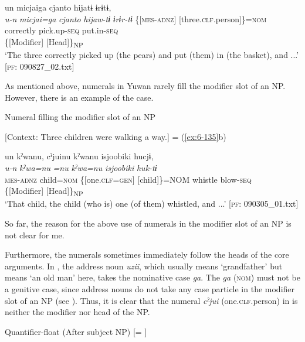 \ex \label{ex:7:14b}
{\TM}
\glll un  micjaiga  {\textbar}cjanto{\textbar}  hijatɨ  ɨrɨtɨ,\\
      \textit{u-n}  \textit{micjai=ga}  \textit{cjanto}  \textit{hijaw-tɨ}      \textit{ɨrɨr-tɨ}
      \{[\textsc{mes}-\textsc{adnz}]  [three.\textsc{clf}.person]\}=\textsc{nom}  correctly  pick.up-\textsc{seq}            put.in-\textsc{seq}\\
      \{[Modifier]  [Head]\}\textsubscript{NP}    \\
\glt    ‘The three correctly picked up (the pears) and put (them) in (the basket), and ...’     [\textsc{pf}: 090827\_02.txt]

    \z
\z

As mentioned above, numerals in Yuwan rarely fill the modifier slot of an NP. However, there is an example of the case.

\ea \label{ex:7:15}  Numeral filling the modifier slot of an NP

  [Context: Three children were walking a way.] = (\ref{ex:6-135}b)

{\TM}
\gllll  un  kˀwanu,  cˀjuinu  kˀwanu  isjoobiki   hucjɨ,\\
\textit{u-n}  \textit{kˀwa=nu}  \textit{=nu}  \textit{kˀwa=nu}  \textit{isjoobiki} \textit{huk-tɨ}\\
\textsc{mes}-\textsc{adnz}  child=\textsc{nom}  \{[one.\textsc{clf}=\textsc{gen}]  [child]\}=NOM  whistle   blow-\textsc{seq}\\
\{[Modifier]  [Head]\}\textsubscript{NP}      \\
\glt ‘That child, the child (who is) one (of them) whistled, and ...’ [\textsc{pf}: 090305\_01.txt]

\z

So far, the reason for the above use of numerals in the modifier slot of an NP is not clear for me.

Furthermore, the numerals sometimes immediately follow the heads of the core arguments. In , the address noun \textit{uzii}, which usually means ‘grandfather’ but means ‘an old man’ here, takes the nominative case \textit{ga}. The \textit{ga} (\textsc{nom}) must not be a genitive case, since address nouns do not take any case particle in the modifier slot of an NP (see ). Thus, it is clear that the numeral \textit{cˀjui} (one.\textsc{clf}.person) in  is neither the modifier nor head of the NP.

\ea \label{ex:7:16}  Quantifier-float (After subject NP) [= ]

